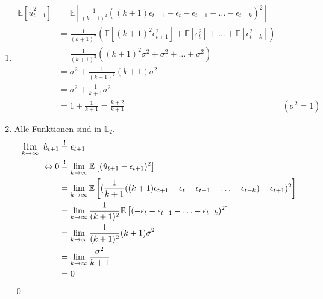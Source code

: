 \documentclass[a4paper,11pt,notitlepage,fullpage]{article}
\newcommand{\E}[1]{\mathbb E\left[#1\right]}
\DeclareMathOperator*{\limm}{l.\hspace{-0.18em}i.\hspace{-0.19em}m}
\begin{document}
\begin{enumerate}
\begin{enumerate}
\item \begin{align*}
\E{\tilde u_{t+1}^2} &= \E{\frac{1}{(k+1)^2} ((k+1) \epsilon_{t+1} - \epsilon_t - \epsilon_{t-1} - \ldots - \epsilon_{t-k})^2} \\
&= \frac{1}{(k+1)^2} (\E{(k+1)^2 \epsilon_{t+1}^2} + \E{\epsilon_t^2} + \ldots + \E{\epsilon_{t-k}^2}) \\
&= \frac{1}{(k+1)^2} ((k+1)^2\sigma^2 + \sigma^2 + \ldots + \sigma^2) \\
&= \sigma^2 + \frac{1}{(k+1)^2}(k+1)\sigma^2 \\
&= \sigma^2 + \frac{1}{k+1}\sigma^2 \\
&= 1 + \frac{1}{k+1} = \frac{k+2}{k+1} &(\sigma^2 = 1)
\end{align*}

\item Alle Funktionen sind in $\mathbb L_2$.
\begin{align*}
\limm_{k\to\infty}~\hat u_{t+1} &\stackrel{!}{=} \epsilon_{t+1} \\
\Leftrightarrow 0 &\stackrel{!}{=} \lim_{k\to\infty} \E{(\hat u_{t+1} - \epsilon_{t+1})^2} \\
&= \lim_{k\to\infty} \E{(\frac{1}{k+1} ((k+1) \epsilon_{t+1} - \epsilon_t - \epsilon_{t-1} - \ldots - \epsilon_{t-k}) - \epsilon_{t+1})^2} \\
&= \lim_{k\to\infty} \frac{1}{(k+1)^2} \E{(- \epsilon_t - \epsilon_{t-1} - \ldots - \epsilon_{t-k})^2} \\
&= \lim_{k\to\infty} \frac{1}{(k+1)^2} (k+1) \sigma^2 \\
&= \lim_{k\to\infty} \frac{\sigma^2}{k+1} \\
&= 0
\end{align*} \qed
\end{enumerate}


\end{enumerate}
\end{document}
